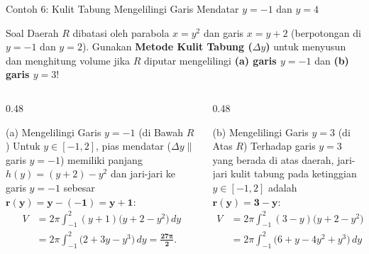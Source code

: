 \documentclass[aspectratio=43,10pt]{beamer}
\begin{document}
\begin{frame}{Contoh 6: Kulit Tabung Mengelilingi Garis Mendatar $y = -1$ dan $y = 4$}
    \begin{exampleblock}{Soal}
        \scriptsize
        Daerah $R$ dibatasi oleh parabola $x = y^2$ dan garis $x = y + 2$ (berpotongan di $y = -1$ dan $y = 2$). Gunakan \textbf{Metode Kulit Tabung ($\Delta y$)} untuk menyusun dan menghitung volume jika $R$ diputar mengelilingi \textbf{(a) garis $y = -1$} dan \textbf{(b) garis $y = 3$}!
    \end{exampleblock}

    \begin{columns}[T]
        \begin{column}{0.48\textwidth}
            \begin{block}{(a) Mengelilingi Garis $y = -1$ (di Bawah $R$)}
                \scriptsize\abovedisplayskip=2pt\belowdisplayskip=2pt
                Untuk $y \in [-1, 2]$, pias mendatar ($\Delta y \parallel$ garis $y = -1$) memiliki panjang $h(y) = (y + 2) - y^2$ dan jari-jari ke garis $y = -1$ sebesar $\mathbf{r(y) = y - (-1) = y + 1}$:
                \begin{align*}
                    V &= 2\pi\int_{-1}^{2} (y + 1)\big(y + 2 - y^2\big)\,dy\\
                    &= 2\pi\int_{-1}^{2} \big(2 + 3y - y^3\big)\,dy = \mathbf{\frac{27\pi}{2}}.
                \end{align*}
            \end{block}
        \end{column}

        \begin{column}{0.48\textwidth}
            \begin{alertblock}{(b) Mengelilingi Garis $y = 3$ (di Atas $R$)}
                \scriptsize\abovedisplayskip=2pt\belowdisplayskip=2pt
                Terhadap garis $y = 3$ yang berada di atas daerah, jari-jari kulit tabung pada ketinggian $y \in [-1, 2]$ adalah $\mathbf{r(y) = 3 - y}$:
                \begin{align*}
                    V &= 2\pi\int_{-1}^{2} (3 - y)\big(y + 2 - y^2\big)\,dy\\
                    &= 2\pi\int_{-1}^{2} \big(6 + y - 4y^2 + y^3\big)\,dy = \mathbf{\frac{45\pi}{2}}.
                \end{align*}
            \end{alertblock}
        \end{column}
    \end{columns}
\end{frame}
\end{document}
